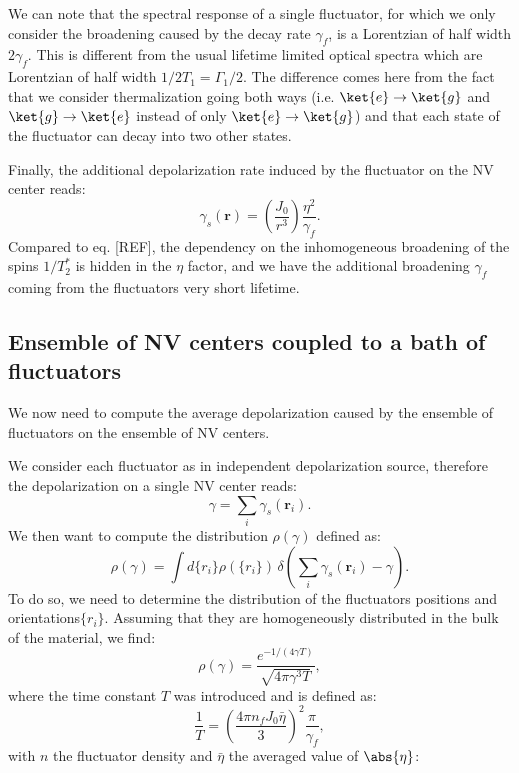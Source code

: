 \documentclass[a4paper,11pt]{report}
\begin{document}
\begin{refsection}
We can note that the spectral response of a single fluctuator, for which we only consider the broadening caused by the decay rate $\gamma_f$, is a Lorentzian of half width $2\gamma_f$. This is different from the usual lifetime limited optical spectra which are Lorentzian of half width $1/2T_1=\Gamma_1/2$. The difference comes here from the fact that we consider thermalization going both ways (i.e. $\ket{e} \to \ket{g}$ and $\ket{g} \to \ket{e}$ instead of only $\ket{e} \to \ket{g}$) and that each state of the fluctuator can decay into two other states.

Finally, the additional depolarization rate induced by the fluctuator on the NV center reads:
\begin{equation}
\gamma_s(\mathbf{r})=\left(\frac{J_0}{r^3}\right) \frac{\eta^2}{\gamma_f}.
\end{equation}
Compared to eq. [REF], the dependency on the inhomogeneous broadening of the spins $1/T_2^*$ is hidden in the $\eta$ factor, and we have the additional broadening $\gamma_f$ coming from the fluctuators very short lifetime.

\subsection{Ensemble of NV centers coupled to a bath of fluctuators}

We now need to compute the average depolarization caused by the ensemble of fluctuators on the ensemble of NV centers.

We consider each fluctuator as in independent depolarization source, therefore the depolarization on a single NV center reads: 
\begin{equation}
\gamma=\sum_i \gamma_s(\mathbf{r}_i).
\end{equation}
We then want to compute the distribution $\rho(\gamma)$ defined as:
\begin{equation}
\rho(\gamma)=\int d\{r_i\} \rho(\{r_i\})\, \delta \left( \sum_i \gamma_s(\mathbf{r}_i) - \gamma \right).
\end{equation}
To do so, we need to determine the distribution of the fluctuators positions and orientations$\{r_i\}$. Assuming that they are homogeneously distributed in the bulk of the material, we find:
\begin{equation}
\rho(\gamma)=\frac{e^{-1/(4\gamma T)}}{\sqrt{4\pi \gamma^3 T}},
\end{equation}
where the time constant $T$ was introduced and is defined as:
\begin{equation}
\frac{1}{T}=\left(\frac{4\pi n_fJ_0\bar \eta}{3}\right)^2 \frac{\pi}{\gamma_f},
\label{eq 1/T}
\end{equation}
with $n$ the fluctuator density and $\bar \eta$ the averaged value of $\abs{\eta}$: 


\end{refsection}
\end{document}
